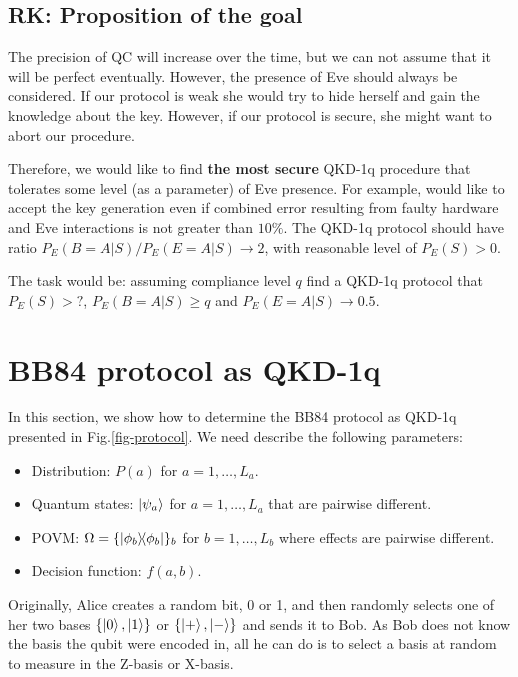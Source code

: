 \documentclass[12pt,a4paper,reqno, aps, superscriptaddress]{amsart}
\newcommand{\proj}[1]{\ensuremath{\ketbra{#1}{#1}}}
\begin{document}
\subsection{RK: Proposition of the goal}
The precision of QC will increase over the time, but we can not assume that it will be perfect eventually. However, the presence of Eve should always be considered. If our protocol is weak she would try to hide herself and gain the knowledge about the key. However, if our protocol is secure, she might want to abort our procedure. 

Therefore, we would like to find \textbf{the most secure} QKD-1q procedure that tolerates some level (as a parameter) of Eve presence. For example, would like to accept the key generation even if combined error resulting from faulty hardware and Eve interactions is not greater than $10\%$. The QKD-1q protocol should have ratio $P_E(B=A|S)/P_E(E=A|S) \to 2$, with reasonable level of $P_E(S) > 0$.

The task would be: assuming compliance level $q$ find a QKD-1q protocol that $P_E(S) > ?$, $P_E(B=A|S)\ge q$ and $P_E(E=A|S) \to 0.5$. 

\section{BB84 protocol as QKD-1q}

In this section, we show how to determine the BB84 protocol as QKD-1q presented in Fig.\ref{fig-protocol}. We need describe the following parameters: 
\begin{itemize}
    \item Distribution: $P(a)$ for $a=1,\ldots,L_a$. 
    \item Quantum states: $ \ket{\psi_a}$ for $a=1,\ldots,L_a$ that are pairwise different.
    \item POVM: $\Omega = \{\proj{\phi_b}\}_b$ for $b=1,\ldots,L_b$ where effects are pairwise different.
    \item Decision function: $f(a, b)$.
\end{itemize} 

Originally, Alice creates a random bit, 0 or 1, and then randomly selects one of her two bases $\{ \ket{0}, \ket{1}\}$ or $\{\ket{+}, \ket{-}\} $ and sends it to Bob. As Bob does not know the basis the qubit were encoded in,  all he can do is to select a basis at random to measure in the Z-basis or X-basis. 
\end{document}
